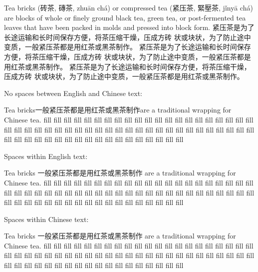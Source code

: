 \documentclass{article}
\newcommand{\cn}{\mktsFontfileSunexta\cjkgUseCjkGlue}
\begin{document}
\begin{multicols}{3}%
Tea bricks ({\cn 砖茶}, {\cn 磚茶}, zhuān chá) or compressed tea
({\cn 紧压茶}, {\cn 緊壓茶}, jǐnyā chá) are blocks of whole or finely ground black tea,
green tea, or post-fermented tea leaves that have been packed in molds and
pressed into block form. {\cn 紧压茶是为了长途运输和长时间保存方便，将茶压缩干燥，压成方砖
状或块状，为了防止途中变质，一般紧压茶都是用红茶或黑茶制作。
紧压茶是为了长途运输和长时间保存方便，将茶压缩干燥，压成方砖
状或块状，为了防止途中变质，一般紧压茶都是用红茶或黑茶制作。
紧压茶是为了长途运输和长时间保存方便，将茶压缩干燥，压成方砖
状或块状，为了防止途中变质，一般紧压茶都是用红茶或黑茶制作。}

\end{multicols}

No spaces between English and Chinese text:
\begin{multicols}{3}%
Tea bricks{\cn 一般紧压茶都是用红茶或黑茶制作}are a traditional wrapping for Chinese tea.
fill fill fill fill fill fill fill fill fill fill fill fill fill fill fill fill
fill fill fill fill fill fill fill fill fill fill fill fill fill fill fill fill
fill fill fill fill fill fill fill fill fill fill fill fill fill fill fill fill
fill fill fill fill fill fill fill fill fill fill fill fill fill fill fill fill
\end{multicols}

Spaces within English text:
\begin{multicols}{3}%
Tea bricks {\cn 一般紧压茶都是用红茶或黑茶制作} are a traditional wrapping for Chinese tea.
fill fill fill fill fill fill fill fill fill fill fill fill fill fill fill fill
fill fill fill fill fill fill fill fill fill fill fill fill fill fill fill fill
fill fill fill fill fill fill fill fill fill fill fill fill fill fill fill fill
fill fill fill fill fill fill fill fill fill fill fill fill fill fill fill fill
\end{multicols}

Spaces within Chinese text:
\begin{multicols}{3}%
Tea bricks{\cn{} 一般紧压茶都是用红茶或黑茶制作 }are a traditional wrapping for Chinese tea.
fill fill fill fill fill fill fill fill fill fill fill fill fill fill fill fill
fill fill fill fill fill fill fill fill fill fill fill fill fill fill fill fill
fill fill fill fill fill fill fill fill fill fill fill fill fill fill fill fill
fill fill fill fill fill fill fill fill fill fill fill fill fill fill fill fill
\end{multicols}
\end{document}
